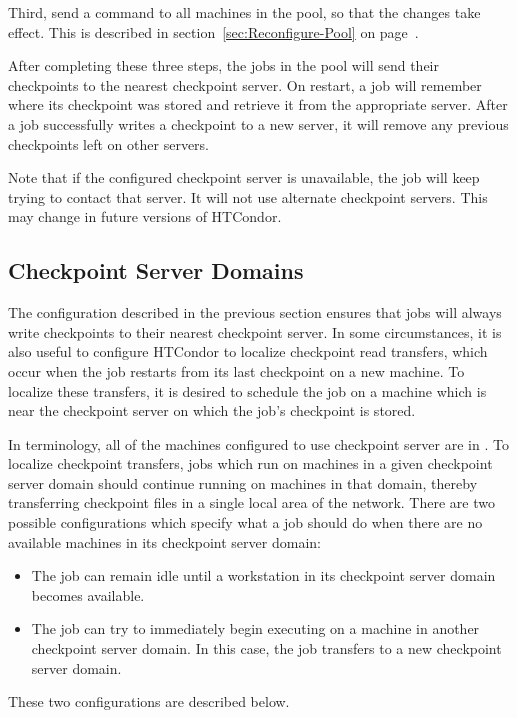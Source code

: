 Third, send a
 command to all machines in the pool, 
so that the changes take effect.
This is described in section~\ref{sec:Reconfigure-Pool} on
page~\pageref{sec:Reconfigure-Pool}.

After completing these three steps, the jobs in the pool will
send their checkpoints to the nearest checkpoint server.
On restart, a job will remember where its checkpoint was
stored and retrieve it from the appropriate server.
After a job successfully writes a checkpoint to a new server, it will
remove any previous checkpoints left on other servers.

Note that if the configured checkpoint server is unavailable,
the job will keep trying to contact that server.
It will not use alternate checkpoint servers.
This may change in future versions of HTCondor.

\subsection{\label{Checkpoint-Server-Domains} 
Checkpoint Server Domains}

The configuration described in the previous section ensures that jobs
will always write checkpoints to their nearest checkpoint server.  In
some circumstances, it is also useful to configure HTCondor to localize
checkpoint read transfers, which occur when the job restarts from its
last checkpoint on a new machine.  To localize these transfers, 
it is desired
to schedule the job on a machine which is near the checkpoint
server on which the job's checkpoint is stored.

In terminology, all of the machines configured to use checkpoint
server  are in .
To localize checkpoint transfers, 
jobs which run on machines in a given
checkpoint server domain should continue running on machines in that domain,
thereby transferring checkpoint files in a single local area of the network.
There are two possible configurations which specify what a
job should do when there are no available machines in its checkpoint
server domain:
\begin{itemize}
\item The job can remain idle until a workstation in its checkpoint
server domain becomes available.
\item The job can try to immediately begin executing on a machine
in another checkpoint server domain.  In this case, the job transfers
to a new checkpoint server domain.
\end{itemize}
These two configurations are described below.

